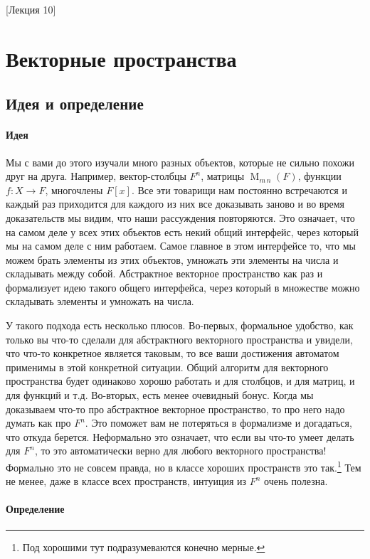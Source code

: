 [Лекция 10]

\newpage
\section{Векторные пространства}

\subsection{Идея и определение}

\paragraph{Идея}
Мы с вами до этого изучали много разных объектов, которые не сильно похожи друг на друга. Например, вектор-столбцы $F^n$, матрицы $\operatorname{M}_{m\,n}(F)$, функции $f\colon X\to F$, многочлены $F[x]$. Все эти товарищи нам постоянно встречаются и каждый раз приходится для каждого из них все доказывать заново и во время доказательств мы видим, что наши рассуждения повторяются. Это означает, что на самом деле у всех этих объектов есть некий общий интерфейс, через который мы на самом деле с ним работаем. Самое главное в этом интерфейсе то, что мы можем брать элементы из этих объектов, умножать эти элементы на числа и складывать между собой. Абстрактное векторное пространство как раз и формализует идею такого общего интерфейса, через который в множестве можно складывать элементы и умножать на числа. 

У такого подхода есть несколько плюсов. Во-первых, формальное удобство, как только вы что-то сделали для абстрактного векторного пространства и увидели, что что-то конкретное является таковым, то все ваши достижения автоматом применимы в этой конкретной ситуации. Общий алгоритм для векторного пространства будет одинаково хорошо работать и для столбцов, и для матриц, и для функций и т.д. Во-вторых, есть менее очевидный бонус. Когда мы доказываем что-то про абстрактное векторное пространство, то про него надо думать как про $F^n$. Это поможет вам не потеряться в формализме и догадаться, что откуда берется. Неформально это означает, что если вы что-то умеет делать для $F^n$, то это автоматически верно для любого векторного пространства! Формально это не совсем правда, но в классе хороших пространств это так.\footnote{Под хорошими тут подразумеваются конечно мерные.} Тем не менее, даже в классе всех пространств, интуиция из $F^n$ очень полезна.


\paragraph{Определение}

